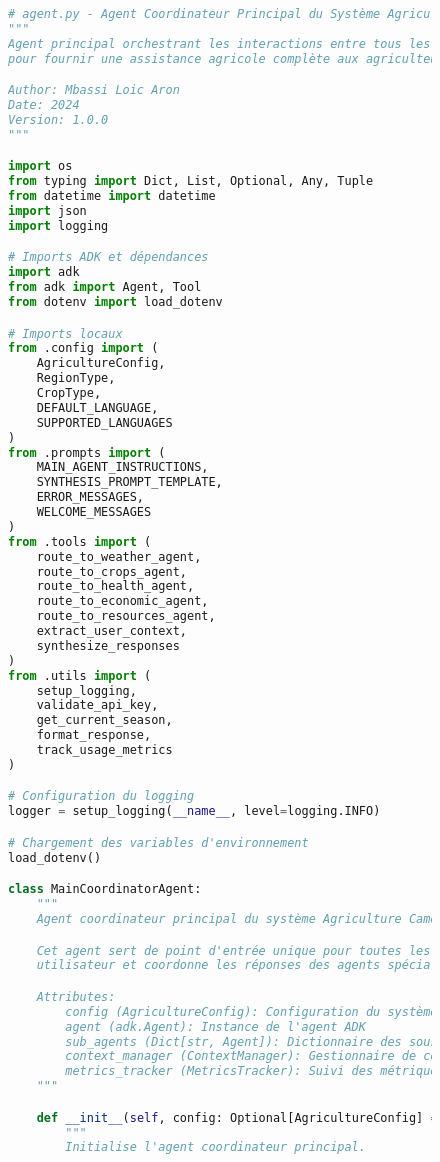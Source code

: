 \begin{figure}[h]
\centering
\begin{lstlisting}[language=Python, caption=Structure complète de l'agent principal]
# agent.py - Agent Coordinateur Principal du Système Agriculture Cameroun
"""
Agent principal orchestrant les interactions entre tous les agents spécialisés
pour fournir une assistance agricole complète aux agriculteurs camerounais.

Author: Mbassi Loic Aron
Date: 2024
Version: 1.0.0
"""

import os
from typing import Dict, List, Optional, Any, Tuple
from datetime import datetime
import json
import logging

# Imports ADK et dépendances
import adk
from adk import Agent, Tool
from dotenv import load_dotenv

# Imports locaux
from .config import (
    AgricultureConfig,
    RegionType,
    CropType,
    DEFAULT_LANGUAGE,
    SUPPORTED_LANGUAGES
)
from .prompts import (
    MAIN_AGENT_INSTRUCTIONS,
    SYNTHESIS_PROMPT_TEMPLATE,
    ERROR_MESSAGES,
    WELCOME_MESSAGES
)
from .tools import (
    route_to_weather_agent,
    route_to_crops_agent,
    route_to_health_agent,
    route_to_economic_agent,
    route_to_resources_agent,
    extract_user_context,
    synthesize_responses
)
from .utils import (
    setup_logging,
    validate_api_key,
    get_current_season,
    format_response,
    track_usage_metrics
)

# Configuration du logging
logger = setup_logging(__name__, level=logging.INFO)

# Chargement des variables d'environnement
load_dotenv()

class MainCoordinatorAgent:
    """
    Agent coordinateur principal du système Agriculture Cameroun.

    Cet agent sert de point d'entrée unique pour toutes les requêtes
    utilisateur et coordonne les réponses des agents spécialisés.

    Attributes:
        config (AgricultureConfig): Configuration du système
        agent (adk.Agent): Instance de l'agent ADK
        sub_agents (Dict[str, Agent]): Dictionnaire des sous-agents
        context_manager (ContextManager): Gestionnaire de contexte
        metrics_tracker (MetricsTracker): Suivi des métriques
    """

    def __init__(self, config: Optional[AgricultureConfig] = None):
        """
        Initialise l'agent coordinateur principal.


\end{lstlisting}
\end{figure}
